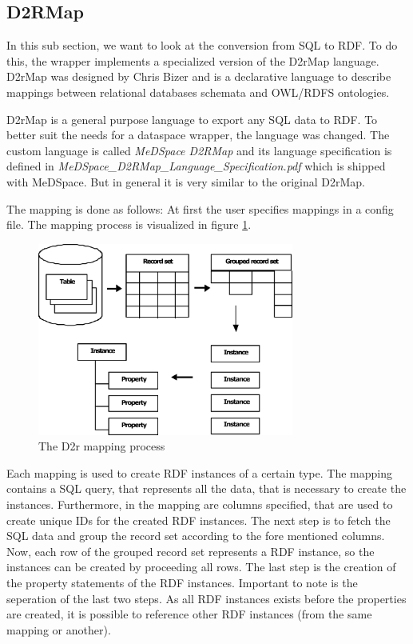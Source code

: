 \subsection{D2RMap}

In this sub section, we want to look at the conversion from SQL to RDF. To do this, the wrapper implements a specialized version of the D2rMap language. D2rMap was designed by Chris Bizer and is  a declarative language to describe mappings between relational databases schemata and OWL/RDFS ontologies\cite{D2rMap_aDatabaseToRdfMappingLanguage}.

D2rMap is a general purpose language to export any SQL data to RDF. To better suit the needs for a dataspace wrapper, the language was changed. The custom language is called \emph{MeDSpace D2RMap} and its language specification is defined in \emph{MeDSpace\_D2RMap\_Language\_Specification.pdf} which is shipped with MeDSpace. But in general it is very similar to the original D2rMap.

The mapping is done as follows: At first the user specifies mappings in a config file. 
The mapping process is visualized in figure \ref{D2rMappingProcessFigure}.

\begin{figure}[H]
	\begin{center}
		\includegraphics[width=0.75\textwidth]{figures/MappingProcess.png}
	\end{center}
	\caption{The D2r mapping process \cite{D2rMap_aDatabaseToRdfMappingLanguage}}
	\label{D2rMappingProcessFigure}
\end{figure}

Each mapping is used to create RDF instances of a certain type. The mapping contains a SQL query, that represents all the data, that is necessary to create the instances. Furthermore, in the mapping are columns specified, that are used to create unique IDs for the created RDF instances.
The next step is to fetch the SQL data and group the record set according to the fore mentioned columns. Now, each row of the grouped record set represents a RDF instance, so the instances can be created by proceeding all rows. The last step is the creation of the property statements of the RDF instances. Important to note is the seperation of the last two steps. As all RDF instances exists before the properties are created, it is possible to reference other RDF instances (from the same mapping or another).

